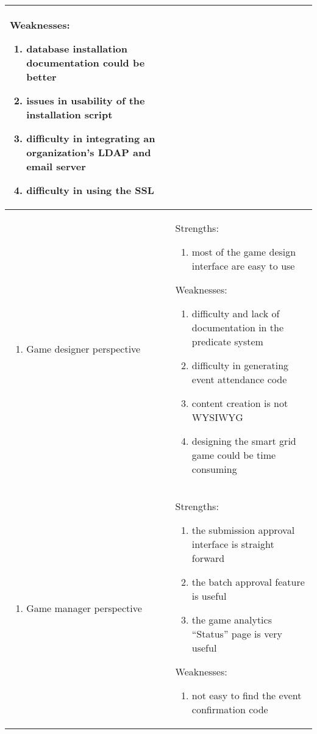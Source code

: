 \begin{table}[ht!]
\begin{tabular}{|P{0.15\columnwidth}|P{0.78\columnwidth}|}
\begin{enumerate}[label={}, nosep, leftmargin=*]
    \end{enumerate}               
    Weaknesses:
    \begin{enumerate}[nosep, leftmargin=*]
    \item database installation documentation could be better
    \item issues in usability of the installation script
    \item difficulty in integrating an organization's LDAP and email server
    \item difficulty in using the SSL
    \end{enumerate} \\
    \hline
    \begin{enumerate}[label={}, nosep, leftmargin=*]
    \item Game designer perspective
    \end{enumerate}
    & 
    Strengths:
    \begin{enumerate}[label={}, nosep, leftmargin=*]
    \item most of the game design interface are easy to use 
    \end{enumerate} 
    Weaknesses:
    \begin{enumerate}[nosep, leftmargin=*]
    \item difficulty and lack of documentation in the predicate system 
    \item difficulty in generating event attendance code
    \item content creation is not WYSIWYG
    \item designing the smart grid game could be time consuming
    \end{enumerate} \\
    \hline
    \begin{enumerate}[label={}, nosep, leftmargin=*]
    \item Game manager perspective 
    \end{enumerate}
    & 
    Strengths:
    \begin{enumerate}[nosep, leftmargin=*]
    \item the submission approval interface is straight forward 
    \item the batch approval feature is useful 
    \item the game analytics ``Status'' page is very useful
    \end{enumerate} 
    Weaknesses:
    \begin{enumerate}[nosep, leftmargin=*]
    \item not easy to find the event confirmation code 

\end{enumerate}
\end{tabular}
\end{table}
